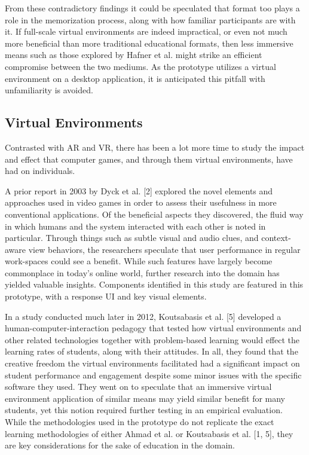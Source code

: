 \documentclass{vgtc}                          %
\begin{document}
From these contradictory findings it could be speculated that format too plays a role in the memorization process, along with how familiar participants are with it. If full-scale virtual environments are indeed impractical, or even not much more beneficial than more traditional educational formats, then less immersive means such as those explored by Hafner et al. might strike an efficient compromise between the two mediums. As the prototype utilizes a virtual environment on a desktop application, it is anticipated this pitfall with unfamiliarity is avoided.

\subsection{Virtual Environments}

Contrasted with AR and VR, there has been a lot more time to study the impact and effect that computer games, and through them virtual environments, have had on individuals.

A prior report in 2003 by Dyck et al. [2] explored the novel elements and approaches used in video games in order to assess their usefulness in more conventional applications. Of the beneficial aspects they discovered, the fluid way in which humans and the system interacted with each other is noted in particular. Through things such as subtle visual and audio clues, and context-aware view behaviors, the researchers speculate that user performance in regular work-spaces could see a benefit. While such features have largely become commonplace in today's online world, further research into the domain has yielded valuable insights. Components identified in this study are featured in this prototype, with a response UI and key visual elements.

In a study conducted much later in 2012, Koutsabasis et al. [5] developed a human-computer-interaction pedagogy that tested how virtual environments and other related technologies together with problem-based learning would effect the learning rates of students, along with their attitudes. In all, they found that the creative freedom the virtual environments facilitated had a significant impact on student performance and engagement despite some minor issues with the specific software they used. They went on to speculate that an immersive virtual environment application of similar means may yield similar benefit for many students, yet this notion required further testing in an empirical evaluation. While the methodologies used in the prototype do not replicate the exact learning methodologies of either Ahmad et al. or Koutsabasis et al. [1, 5], they are key considerations for the sake of education in the domain.
\end{document}

